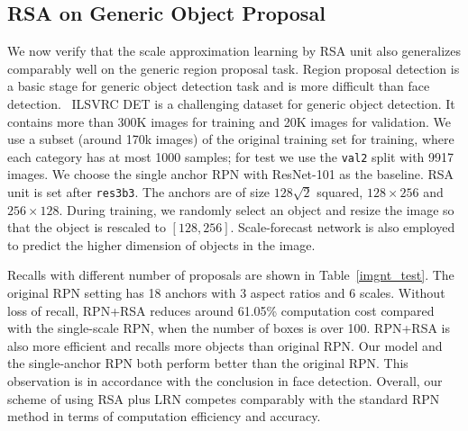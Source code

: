 \documentclass[10pt,twocolumn,letterpaper]{article}
\begin{document}
\subsection{RSA on Generic Object Proposal}
\label{imagenet}
We now verify that the scale approximation learning by RSA unit also generalizes comparably well on the generic region proposal task.
%
Region proposal detection is a basic stage for generic object detection task and is more difficult than face detection. \
ILSVRC DET \cite{imagenet_conf} is a challenging dataset for generic object detection. It contains more than 300K images for training and 20K images for validation. 
%
We use a subset (around 170k images) of the original training set for training, where 
each category has at most 1000 samples; for test we use the \texttt{val2} split \cite{girshick2014rich} with 9917 images.
%
%
We choose the single anchor RPN with ResNet-101 as the baseline. RSA unit is set after \texttt{res3b3}. 
The anchors are of size $128\sqrt{2}$ squared, $128\times256$ and $256\times128$. 
%
%
During training, we randomly select an object and resize the image so that the object is rescaled to
$[128, 256]$. Scale-forecast network is also employed to predict the higher dimension of objects in the image. 

Recalls with different number of proposals are shown in Table~\ref{imgnt_test}.
The original RPN setting has  18 anchors with 3 aspect ratios and 6 scales.
%
Without loss of recall, RPN+RSA reduces around 61.05\% computation cost compared with the single-scale RPN, when the number of boxes is over 100. RPN+RSA is also more efficient and recalls more objects than original RPN.
Our model and the single-anchor RPN both perform better than the original RPN. 
This observation is in accordance with the conclusion in face detection. 
%
Overall, our scheme of using RSA plus LRN competes comparably with the standard RPN method in terms of computation efficiency and accuracy.

\end{document}
